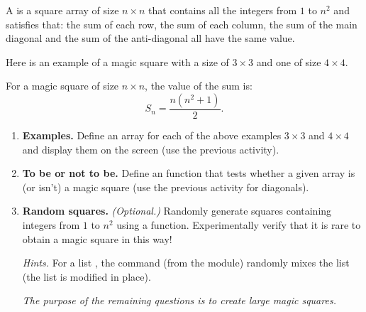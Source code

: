 \documentclass[11pt,class=report,crop=false]{standalone}
\begin{document}

\begin{activite}




A  is a square array of size $n\times n$ that contains all the integers from $1$ to $n^2$ and satisfies that:
the sum of each row, the sum of each column, the sum of the main diagonal and the sum of the anti-diagonal all have the same value.

Here is an example of a magic square with a size of $3\times 3$ and one of size  $4\times 4$.





For a magic square of size $n \times n$, the value of the sum is:
$$S_n = \frac{n(n^2+1)}{2}.$$



\begin{enumerate}
  \item \textbf{Examples.} Define an array for each of the above examples $3 \times 3$ and $4 \times 4$ and display them on the screen (use the previous activity).
  
  \item \textbf{To be or not to be.} Define an  function that tests whether a given array is (or isn't) a magic square (use the previous activity for diagonals).
  
  \item \textbf{Random squares.} \emph{(Optional.)} Randomly generate squares containing integers from $1$ to $n^2$ using a  function. Experimentally verify that it is rare to obtain a magic square in this way! 

  \emph{Hints.} For a list , the command  (from the  module) randomly mixes the list (the list is modified in place). 
 
 
 \medskip
	
  \emph{The purpose of the remaining questions is to create large magic squares.}
	 

\end{enumerate}
\end{activite}
\end{document}
